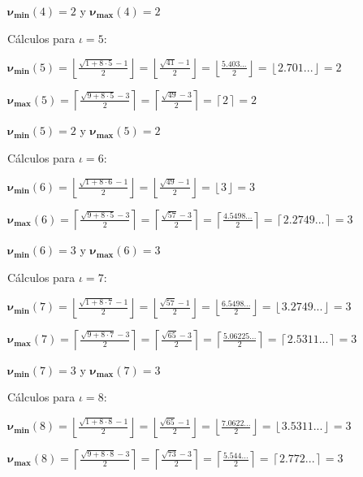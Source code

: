 \documentclass{amsart}
\theoremstyle{definition}
\theoremstyle{remark}
\numberwithin{equation}{section}
\newcommand{\monrel}[1]{\mathbf{#1}}
\newcommand{\funct}[1]{\monrel{#1}}
\newcommand{\functat}[2]{\funct{#1}{\left({#2}\right)}}
\begin{document}
$\functat{{\nu}_{\min}}{4} = 2$ y $\functat{{\nu}_{\max}}{4} = 2$


Cálculos para $\iota = 5$:


$\functat{{\nu}_{\min}}{5} =
\left\lfloor\frac{\sqrt{1+8\cdot 5}-1}{2}\right\rfloor =
\left\lfloor\frac{\sqrt{41}-1}{2}\right\rfloor =
\left\lfloor\frac{5.403...}{2}\right\rfloor =
\left\lfloor{2.701...}\right\rfloor = 2
$


$\functat{{\nu}_{\max}}{5} =
\left\lceil\frac{\sqrt{9+8\cdot 5}-3}{2}\right\rceil =
\left\lceil\frac{\sqrt{49}-3}{2}\right\rceil =
\left\lceil{2}\right\rceil = 2
$


$\functat{{\nu}_{\min}}{5} = 2$ y $\functat{{\nu}_{\max}}{5} = 2$


Cálculos para $\iota = 6$:


$\functat{{\nu}_{\min}}{6} =
\left\lfloor\frac{\sqrt{1+8\cdot 6}-1}{2}\right\rfloor =
\left\lfloor\frac{\sqrt{49}-1}{2}\right\rfloor =
\left\lfloor{3}\right\rfloor = 3
$


$\functat{{\nu}_{\max}}{6} =
\left\lceil\frac{\sqrt{9+8\cdot 5}-3}{2}\right\rceil =
\left\lceil\frac{\sqrt{57}-3}{2}\right\rceil =
\left\lceil\frac{4.5498...}{2}\right\rceil =
\left\lceil{2.2749...}\right\rceil = 3
$


$\functat{{\nu}_{\min}}{6} = 3$ y $\functat{{\nu}_{\max}}{6} = 3$


Cálculos para $\iota = 7$:


$\functat{{\nu}_{\min}}{7} =
\left\lfloor\frac{\sqrt{1+8\cdot 7}-1}{2}\right\rfloor =
\left\lfloor\frac{\sqrt{57}-1}{2}\right\rfloor =
\left\lfloor\frac{6.5498...}{2}\right\rfloor =
\left\lfloor{3.2749...}\right\rfloor = 3
$


$\functat{{\nu}_{\max}}{7} =
\left\lceil\frac{\sqrt{9+8\cdot 7}-3}{2}\right\rceil =
\left\lceil\frac{\sqrt{65}-3}{2}\right\rceil =
\left\lceil\frac{5.06225...}{2}\right\rceil =
\left\lceil{2.5311...}\right\rceil = 3
$


$\functat{{\nu}_{\min}}{7} = 3$ y $\functat{{\nu}_{\max}}{7} = 3$


Cálculos para $\iota = 8$:


$\functat{{\nu}_{\min}}{8} =
\left\lfloor\frac{\sqrt{1+8\cdot 8}-1}{2}\right\rfloor =
\left\lfloor\frac{\sqrt{65}-1}{2}\right\rfloor =
\left\lfloor\frac{7.0622...}{2}\right\rfloor =
\left\lfloor{3.5311...}\right\rfloor = 3
$


$\functat{{\nu}_{\max}}{8} =
\left\lceil\frac{\sqrt{9+8\cdot 8}-3}{2}\right\rceil =
\left\lceil\frac{\sqrt{73}-3}{2}\right\rceil =
\left\lceil\frac{5.544...}{2}\right\rceil =
\left\lceil{2.772...}\right\rceil = 3
$
\end{document}
